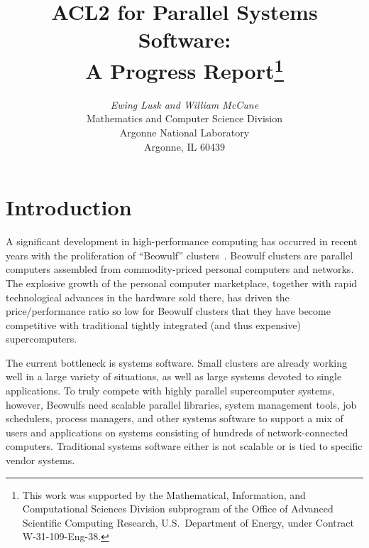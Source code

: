 \documentclass{article}
\begin{document}
\title{\bf ACL2 for Parallel Systems Software:\\A Progress Report\thanks{This
work was supported by the Mathematical, Information, and
Computational Sciences Division subprogram of the Office of
Advanced Scientific Computing Research, U.S.\ Department of Energy,
under Contract W-31-109-Eng-38.}}
\author{\emph{Ewing Lusk and William McCune}\\[0.2in]
         Mathematics and Computer Science Division\\
         Argonne National Laboratory\\
         Argonne, IL 60439}
\maketitle
\thispagestyle{empty}

\section{Introduction}
\label{sec:introduction}

A significant development in high-performance computing has occurred in recent
years with the proliferation of ``Beowulf'' clusters~\cite{beowulf-95}.
Beowulf clusters are parallel computers assembled from commodity-priced
personal computers and networks.  The explosive growth of the personal
computer marketplace, together with rapid technological advances in the
hardware sold there, has driven the price/performance ratio so low for Beowulf
clusters that they have become competitive with traditional tightly integrated
(and thus expensive) supercomputers.

The current bottleneck is systems software.  Small clusters are already
working well in a large variety of situations, as well as large systems
devoted to single applications.  To truly compete with highly parallel
supercomputer systems, however, Beowulfs need scalable parallel libraries,
system management tools, job schedulers, process managers, and other systems
software to support a mix of users and applications on systems consisting of
hundreds of network-connected computers.  Traditional systems software either is
not scalable or is tied to specific vendor systems.
\end{document}
